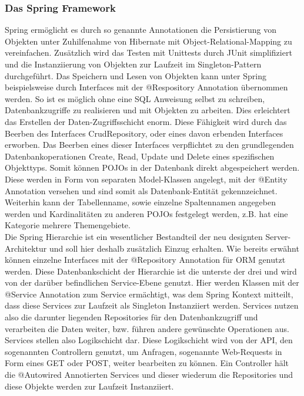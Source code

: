 		\subsubsection{Das Spring Framework}
			Spring ermöglicht es durch so genannte Annotationen die Persistierung von
			Objekten unter Zuhilfenahme von Hibernate mit Object-Relational-Mapping zu
			vereinfachen. Zusätzlich wird das Testen mit Unittests durch JUnit
			simplifiziert und die Instanziierung von Objekten zur Laufzeit im
			Singleton-Pattern durchgeführt. Das Speichern und Lesen von Objekten kann
			unter Spring beispielsweise durch Interfaces mit der @Respository Annotation
			übernommen werden. So ist es möglich ohne eine SQL Anweisung selbst zu
			schreiben, Datenbankzugriffe zu realisieren und mit Objekten zu arbeiten.
			Dies erleichtert das Erstellen der Daten-Zugriffsschicht enorm. Diese
			Fähigkeit wird durch das Beerben des Interfaces CrudRepository, oder eines
			davon erbenden Interfaces erworben. Das Beerben eines dieser Interfaces
			verpflichtet zu den grundlegenden Datenbankoperationen Create, Read, Update
			und Delete eines spezifischen Objekttyps. Somit können POJOs in der
			Datenbank direkt abgespeichert werden. Diese werden in Form von separaten
			Model-Klassen angelegt, mit der @Entity Annotation versehen und sind somit
			als Datenbank-Entität gekennzeichnet. Weiterhin kann der Tabellenname, sowie
			einzelne Spaltennamen angegeben werden und Kardinalitäten zu anderen POJOs
			festgelegt werden, z.B. hat eine Kategorie mehrere Themengebiete.\\
			Die Spring Hierarchie ist ein wesentlicher Bestandteil der neu designten
			Server-Architektur und soll hier deshalb zusätzlich Einzug erhalten. Wie
			bereits erwähnt können einzelne Interfaces mit der @Repository Annotation für
			ORM genutzt werden. Diese Datenbankschicht der Hierarchie ist die unterste
			der drei und wird von der darüber befindlichen Service-Ebene genutzt. Hier
			werden Klassen mit der @Service Annotation zum Service ermächtigt, was dem
			Spring Kontext mitteilt, dass diese Services zur Laufzeit als Singleton
			Instanziiert werden. Services nutzen also die darunter liegenden Repositories
			für den Datenbankzugriff und verarbeiten die Daten weiter, bzw. führen andere
			gewünschte Operationen aus. Services stellen also Logikschicht dar. Diese
			Logikschicht wird von der API, den sogenannten Controllern genutzt, um
			Anfragen, sogenannte Web-Requests in Form eines GET oder POST, weiter
			bearbeiten zu können. Ein Controller hält die @Autowired Annotierten Services
			und dieser wiederum die Repositories und diese Objekte werden zur Laufzeit
			Instanziiert.


